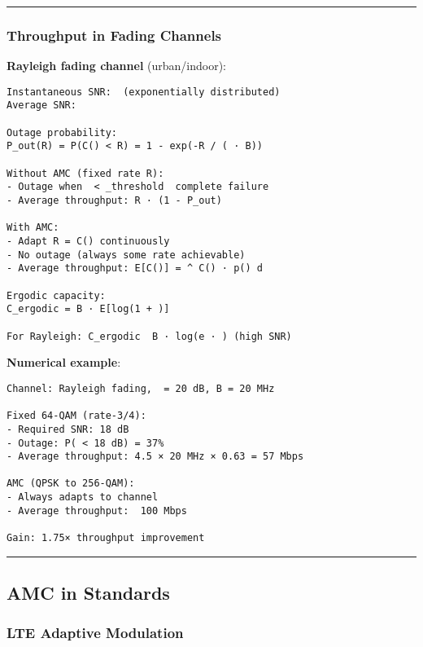 \begin{center}\rule{0.5\linewidth}{0.5pt}\end{center}

\subsubsection{Throughput in Fading
Channels}\label{throughput-in-fading-channels}

\textbf{Rayleigh fading channel} (urban/indoor):

\begin{verbatim}
Instantaneous SNR:  (exponentially distributed)
Average SNR: 

Outage probability:
P_out(R) = P(C() < R) = 1 - exp(-R / ( · B))

Without AMC (fixed rate R):
- Outage when  < _threshold  complete failure
- Average throughput: R · (1 - P_out)

With AMC:
- Adapt R = C() continuously
- No outage (always some rate achievable)
- Average throughput: E[C()] = ^ C() · p() d

Ergodic capacity:
C_ergodic = B · E[log(1 + )]

For Rayleigh: C_ergodic  B · log(e · ) (high SNR)
\end{verbatim}

\textbf{Numerical example}:

\begin{verbatim}
Channel: Rayleigh fading,  = 20 dB, B = 20 MHz

Fixed 64-QAM (rate-3/4):
- Required SNR: 18 dB
- Outage: P( < 18 dB) = 37%
- Average throughput: 4.5 × 20 MHz × 0.63 = 57 Mbps

AMC (QPSK to 256-QAM):
- Always adapts to channel
- Average throughput:  100 Mbps

Gain: 1.75× throughput improvement
\end{verbatim}

\begin{center}\rule{0.5\linewidth}{0.5pt}\end{center}

\subsection{\texorpdfstring{ AMC in
Standards}{ AMC in Standards}}\label{amc-in-standards}

\subsubsection{LTE Adaptive Modulation}\label{lte-adaptive-modulation}

